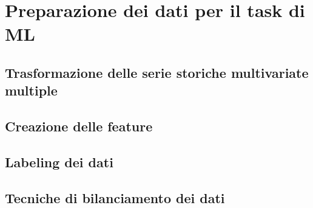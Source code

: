 

\section{Preparazione dei dati per il task di ML}
\subsection{Trasformazione delle serie storiche multivariate multiple}






\subsection{Creazione delle feature}






\subsection{Labeling dei dati}
\subsection{Tecniche di bilanciamento dei dati}





